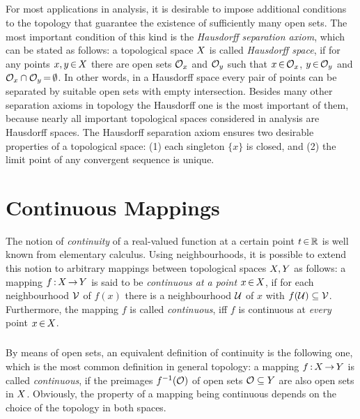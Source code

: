 \documentclass[11pt,twoside]{article}
\begin{document}
\subparagraph{} %
For most applications in analysis,
it is desirable to impose additional conditions to the topology
that guarantee the existence of sufficiently many open sets.
The most important condition of this kind is
the \textit{Hausdorff separation axiom},
which can be stated as follows:
a topological space $X$ is called \textit{Hausdorff space},
if for any points $x,y {\,\in\,} X$
there are open sets $\mathcal{O}_x$ and $\mathcal{O}_y$
such that
$x {\,\in\,} \mathcal{O}_x$, $y {\,\in\,} \mathcal{O}_y$ and
$\mathcal{O}_x \cap \mathcal{O}_y {\,=\,} \emptyset$.
In other words,
in a Hausdorff space
every pair of points can be separated by suitable open sets
with empty intersection.
Besides many other separation axioms in topology
the Hausdorff one is the most important of them,
because nearly all important topological spaces considered in analysis
are Hausdorff spaces.
The Hausdorff separation axiom ensures two desirable properties
of a topological space:
(1) each singleton $\{x\}$ is closed, and
(2) the limit point of any convergent sequence is unique.

\section{Continuous Mappings}                                                  %
The notion of \textit{continuity} of a real-valued function
at a certain point $t {\,\in\,} {\mathbb{R}}$ is well known from elementary calculus.
Using neighbourhoods,
it is possible to extend this notion to arbitrary mappings
between topological spaces $X, Y$ as follows:
a mapping $f {\,:\,} X {\,\to\,} Y$ is said to be \textit{continuous at a point}
$x {\,\in\,} X$,
if for each neighbourhood $\mathcal{V}$ of $f(x)$
there is a neighbourhood $\mathcal{U}$ of $x$ with $f(\mathcal{U}) \subseteq \mathcal{V}$.
Furthermore,
the mapping $f$ is called \textit{continuous},
iff $f$ is continuous at \textit{every} point $x {\,\in\,} X$.

\subparagraph{} %
By means of open sets,
an equivalent definition of continuity is the following one,
which is the most common definition in general topology:
a mapping $f {\,:\,} X {\,\to\,} Y$ is called \textit{continuous},
if the preimages $f^{-1}(\mathcal{O})$ of open sets $\mathcal{O} \subseteq Y$
are also open sets in $X$.
Obviously,
the property of a mapping being continuous
depends on the choice of the topology in both spaces.
\end{document}
